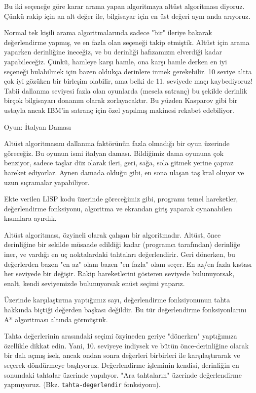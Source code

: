\documentclass[12pt,fleqn]{article}\usepackage{../../common}
\begin{document}
Bu iki seçeneğe göre karar arama yapan algoritmaya altüst algoritması
diyoruz. Çünkü rakip için an alt değer ile, bilgisayar için en üst değeri
aynı anda arıyoruz.

Normal tek kişili arama algoritmalarında sadece "bir" ileriye bakarak
değerlendirme yapmış, ve en fazla olan seçeneği takip etmiştik. Altüst için
arama yaparken derinliğine ineceğiz, ve bu derinliği hafızamızın elverdiği kadar
yapabileceğiz. Çünkü, hamleye karşı hamle, ona karşı hamle derken en iyi
seçeneği bulabilmek için bazen oldukça derinlere inmek gerekebilir. 10 seviye
altta çok iyi gözüken bir birleşim olabilir, ama belki de 11. seviyede maçı
kaybediyoruz! Tabii dallanma seviyesi fazla olan oyunlarda (mesela satranç) bu
şekilde derinlik birçok bilgisayarı donanım olarak zorlayacaktır. Bu yüzden
Kasparov gibi bir ustayla ancak IBM'in satranç için özel yapılmış makinesi
rekabet edebiliyor.

Oyun: İtalyan Daması

Altüst algoritmasını dallanma faktörünün fazla olmadığı bir oyun üzerinde
göreceğiz. Bu oyunun ismi italyan daması. Bildiğimiz dama oyununa çok
benziyor, sadece taşlar düz olarak ileri, geri, sağa, sola gitmek yerine
çapraz hareket ediyorlar. Aynen damada olduğu gibi, en sona ulaşan taş kral
oluyor ve uzun sıçramalar yapabiliyor.

Ekte verilen LISP kodu üzerinde göreceğimiz gibi, programı temel
hareketler, değerlendirme fonksiyonu, algoritma ve ekrandan giriş yaparak
oynanabilen kısımlara ayırdık.

Altüst algoritması, özyineli olarak çalışan bir algoritmadır. Altüst, önce
derinliğine bir sekilde müsaade edildiği kadar (programcı tarafından)
derinliğe iner, ve vardığı en uç noktalardaki tahtaları değerlendirir. Geri
dönerken, bu değerlerden bazen "en az" olanı bazen "en fazla" olanı
seçer. En az/en fazla kıstası her seviyede bir değişir. Rakip hareketlerini
gösteren seviyede bulunuyorsak, enalt, kendi seviyemizde bulunuyorsak enüst
seçimi yaparız.

Üzerinde karşılaştırma yaptığımız sayı, değerlendirme fonksiyonunun tahta
hakkında biçtiği değerden başkası değildir. Bu tür değerlendirme fonksiyonlarını
A* algoritması altında görmüştük.

Tahta değerlerinin arasındaki seçimi özyineden geriye "dönerken"
yaptığımıza özellikle dikkat edin. Yani, 10. seviyeye indiysek ve bütün
önce-derinliğine olarak bir dalı açmış isek, ancak ondan sonra değerleri
birbirleri ile karşılaştırarak ve seçerek döndürmeye
başlıyoruz. Değerlendirme işleminin kendisi, derinliğin en sonundaki
tahtalar üzerinde yapılıyor. "Ara tahtaların" üzerinde değerlendirme
yapmıyoruz. (Bkz. \verb!tahta-degerlendir! fonksiyonu).
\end{document}
